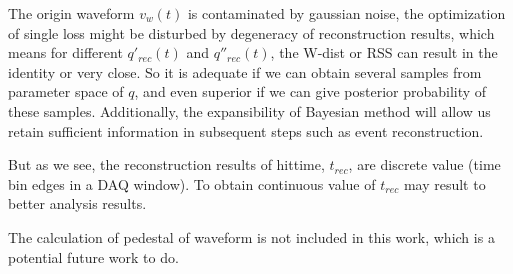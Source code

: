 
The origin waveform $v_{w}(t)$ is contaminated by gaussian noise, the optimization of single loss might be disturbed by degeneracy of reconstruction results, which means for different $q'_{rec}(t)$ and $q''_{rec}(t)$, the W-dist or RSS can result in the identity or very close. So it is adequate if we can obtain several samples from parameter space of $q$, and even superior if we can give posterior probability of these samples. Additionally, the expansibility of Bayesian method will allow us retain sufficient information in subsequent steps such as event reconstruction. 


But as we see, the reconstruction results of hittime, $t_{rec}$, are discrete value (time bin edges in a DAQ window). To obtain continuous value of $t_{rec}$ may result to better analysis results. 


The calculation of pedestal of waveform is not included in this work, which is a potential future work to do. 

